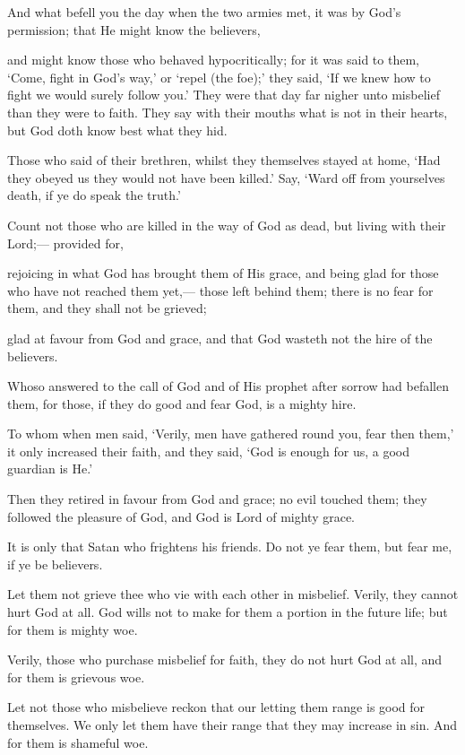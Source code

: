 \documentclass[fontsize=14pt, letterpaper, notitlepage, openany, DIV=12]{scrbook} %
\begin{document}
\noindent[3:166]
And what befell you the day when the two armies met, it was by God's permission; that
He might know the believers,

\noindent[3:167]
and might know those who behaved hypocritically; for it was said to them, `Come, fight
in God's way,' or `repel (the foe);' they said, `If we knew how to fight we would surely follow
you.' They were that day far nigher unto misbelief than they were to faith. They say with their
mouths what is not in their hearts, but God doth know best what they hid.

\noindent[3:168]
Those who said of their brethren, whilst they themselves stayed at home, `Had they
obeyed us they would not have been killed.' Say, `Ward off from yourselves death, if ye do
speak the truth.'

\noindent[3:169]
Count not those who are killed in the way of God as dead, but living with their Lord;---
provided for,

\noindent[3:170]
rejoicing in what God has brought them of His grace, and being glad for those who have
not reached them yet,--- those left behind them; there is no fear for them, and they shall not be
grieved;

\noindent[3:171]
glad at favour from God and grace, and that God wasteth not the hire of the believers.

\noindent[3:172]
Whoso answered to the call of God and of His prophet after sorrow had befallen them,
for those, if they do good and fear God, is a mighty hire.

\noindent[3:173]
To whom when men said, `Verily, men have gathered round you, fear then them,' it only
increased their faith, and they said, `God is enough for us, a good guardian is He.'

\noindent[3:174]
Then they retired in favour from God and grace; no evil touched them; they followed the
pleasure of God, and God is Lord of mighty grace.

\noindent[3:175]
It is only that Satan who frightens his friends. Do not ye fear them, but fear me, if ye be
believers.

\noindent[3:176]
Let them not grieve thee who vie with each other in misbelief. Verily, they cannot hurt
God at all. God wills not to make for them a portion in the future life; but for them is mighty
woe.

\noindent[3:177]
Verily, those who purchase misbelief for faith, they do not hurt God at all, and for them is
grievous woe.

\noindent[3:178]
Let not those who misbelieve reckon that our letting them range is good for themselves.
We only let them have their range that they may increase in sin. And for them is shameful woe.
\end{document}

